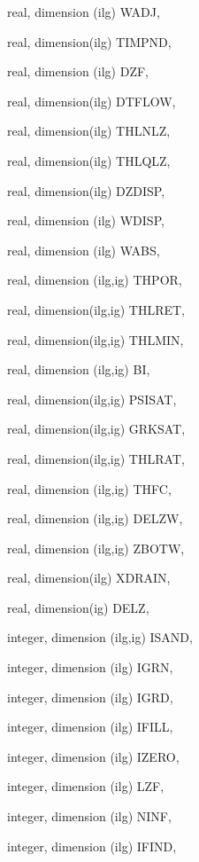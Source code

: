 {\begin{DoxyParamCaption}
\item[{real, dimension  (ilg)}]{W\+A\+D\+J, }
\item[{real, dimension(ilg)}]{T\+I\+M\+P\+N\+D, }
\item[{real, dimension   (ilg)}]{D\+Z\+F, }
\item[{real, dimension(ilg)}]{D\+T\+F\+L\+O\+W, }
\item[{real, dimension(ilg)}]{T\+H\+L\+N\+L\+Z, }
\item[{real, dimension(ilg)}]{T\+H\+L\+Q\+L\+Z, }
\item[{real, dimension(ilg)}]{D\+Z\+D\+I\+S\+P, }
\item[{real, dimension (ilg)}]{W\+D\+I\+S\+P, }
\item[{real, dimension  (ilg)}]{W\+A\+B\+S, }
\item[{real, dimension (ilg,ig)}]{T\+H\+P\+O\+R, }
\item[{real, dimension(ilg,ig)}]{T\+H\+L\+R\+E\+T, }
\item[{real, dimension(ilg,ig)}]{T\+H\+L\+M\+I\+N, }
\item[{real, dimension    (ilg,ig)}]{B\+I, }
\item[{real, dimension(ilg,ig)}]{P\+S\+I\+S\+A\+T, }
\item[{real, dimension(ilg,ig)}]{G\+R\+K\+S\+A\+T, }
\item[{real, dimension(ilg,ig)}]{T\+H\+L\+R\+A\+T, }
\item[{real, dimension  (ilg,ig)}]{T\+H\+F\+C, }
\item[{real, dimension (ilg,ig)}]{D\+E\+L\+Z\+W, }
\item[{real, dimension (ilg,ig)}]{Z\+B\+O\+T\+W, }
\item[{real, dimension(ilg)}]{X\+D\+R\+A\+I\+N, }
\item[{real, dimension(ig)}]{D\+E\+L\+Z, }
\item[{integer, dimension (ilg,ig)}]{I\+S\+A\+N\+D, }
\item[{integer, dimension  (ilg)}]{I\+G\+R\+N, }
\item[{integer, dimension  (ilg)}]{I\+G\+R\+D, }
\item[{integer, dimension (ilg)}]{I\+F\+I\+L\+L, }
\item[{integer, dimension (ilg)}]{I\+Z\+E\+R\+O, }
\item[{integer, dimension   (ilg)}]{L\+Z\+F, }
\item[{integer, dimension  (ilg)}]{N\+I\+N\+F, }
\item[{integer, dimension (ilg)}]{I\+F\+I\+N\+D, }

\end{DoxyParamCaption}}
